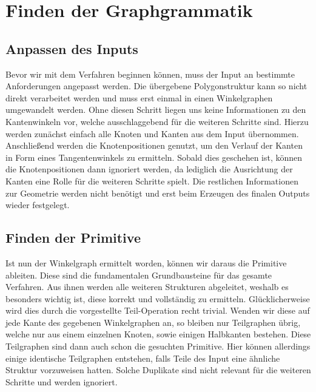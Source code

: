 \section{Finden der Graphgrammatik}
\subsection{Anpassen des Inputs}
Bevor wir mit dem Verfahren beginnen können, muss der Input an bestimmte Anforderungen angepasst werden. Die übergebene Polygonstruktur
kann so nicht direkt verarbeitet werden und muss erst einmal in einen Winkelgraphen umgewandelt werden. Ohne diesen Schritt liegen uns keine
Informationen zu den Kantenwinkeln vor, welche ausschlaggebend für die weiteren Schritte sind. Hierzu werden zunächst einfach alle Knoten und
Kanten aus dem Input übernommen. Anschließend werden die Knotenpositionen genutzt, um den Verlauf der Kanten in Form eines Tangentenwinkels zu
ermitteln. Sobald dies geschehen ist, können die Knotenpositionen dann ignoriert werden, da lediglich die Ausrichtung der Kanten eine Rolle
für die weiteren Schritte spielt. Die restlichen Informationen zur Geometrie werden nicht benötigt und erst beim Erzeugen des finalen Outputs
wieder festgelegt.

\subsection{Finden der Primitive}
Ist nun der Winkelgraph ermittelt worden, können wir daraus die Primitive ableiten. Diese sind die fundamentalen Grundbausteine für das
gesamte Verfahren. Aus ihnen werden alle weiteren Strukturen abgeleitet, weshalb es besonders wichtig ist, diese korrekt und vollständig zu
ermitteln. Glücklicherweise wird dies durch die vorgestellte Teil-Operation recht trivial. Wenden wir diese auf jede Kante des gegebenen
Winkelgraphen an, so bleiben nur Teilgraphen übrig, welche nur aus einem einzelnen Knoten, sowie einigen Halbkanten bestehen. Diese Teilgraphen
sind dann auch schon die gesuchten Primitive. Hier können allerdings einige identische Teilgraphen entstehen, falls Teile des Input eine ähnliche
Struktur vorzuweisen hatten. Solche Duplikate sind nicht relevant für die weiteren Schritte und werden ignoriert.

